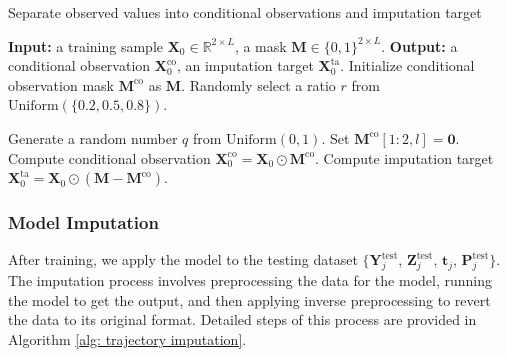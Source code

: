 \documentclass[11pt]{article}
\begin{document}
%
%



\begin{algorithm}
\caption{Separate observed values into conditional observations and imputation target}
\label{alg: random split}
\begin{algorithmic}[1]
\State \textbf{Input:} a training sample $\bm{X}_0\in \mathbb{R}^{2\times L}$, a mask $\bm{M}\in \{0,1\}^{2\times L}$.
\State \textbf{Output:} a conditional observation $\bm{X}_0^{\mathrm{co}}$, an imputation target $\bm{X}_0^{\mathrm{ta}}$.
\State Initialize conditional observation mask $\bm{M}^{\mathrm{co}}$ as $\bm{M}$.
\State Randomly select a ratio $r$ from $\mathrm{Uniform}(\{0.2, 0.5, 0.8\})$.

    \State Generate a random number $q$ from $\mathrm{Uniform}(0,1)$.
        \State Set $\bm{M}^{\mathrm{co}}[1:2, l] = \bm{0}$.
    \EndIf
\EndFor
\State Compute conditional observation $\bm{X}_0^{\mathrm{co}} = \bm{X}_0 \odot \bm{M}^{\mathrm{co}}$.
\State Compute imputation target $\bm{X}_0^{\mathrm{ta}} = \bm{X}_0 \odot (\bm{M} - \bm{M}^{\mathrm{co}})$.
\end{algorithmic}
\end{algorithm}



\subsubsection{Model Imputation}\label{sec: model imputation}

After training, we apply the model to the testing dataset $\{\bm{Y}_j^{\mathrm{test}}$, $\bm{Z}_j^{\mathrm{test}}$, $\bm{t}_j$, $\bm{P}_j^{\mathrm{test}}\}$. The imputation process involves preprocessing the data for the model, running the model to get the output, and then applying inverse preprocessing to revert the data to its original format. Detailed steps of this process are provided in Algorithm \ref{alg: trajectory imputation}.
\end{document}
